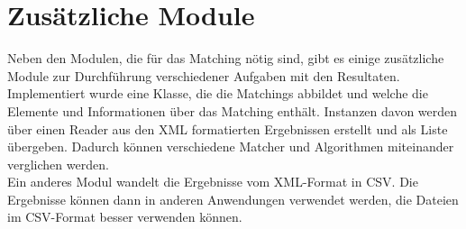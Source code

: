 		\section{Zusätzliche Module}
		Neben den Modulen, die für das Matching nötig sind, gibt es einige zusätzliche
		Module zur Durchführung verschiedener Aufgaben mit den Resultaten.\\
		Implementiert wurde eine Klasse, die die Matchings abbildet und welche die
		Elemente und Informationen über das Matching enthält. Instanzen davon werden
		über einen Reader aus den XML formatierten Ergebnissen erstellt und als Liste
		übergeben. Dadurch können verschiedene Matcher und Algorithmen miteinander
		verglichen werden.\\
		Ein anderes Modul wandelt die Ergebnisse vom XML-Format in CSV. Die Ergebnisse
		können dann in anderen Anwendungen verwendet werden, die Dateien im CSV-Format
		besser verwenden können.